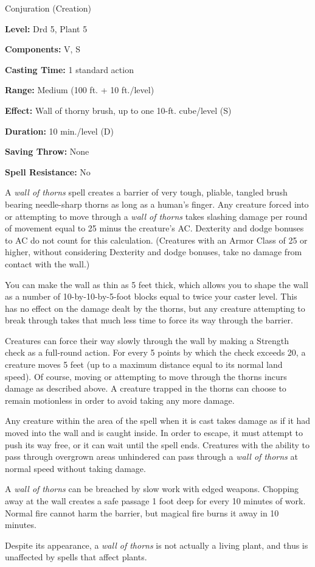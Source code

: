 
Conjuration (Creation)

\textbf{Level:} Drd 5, Plant 5

\textbf{Components:} V, S

\textbf{Casting Time:} 1 standard action

\textbf{Range:} Medium (100 ft. + 10 ft./level)

\textbf{Effect:} Wall of thorny brush, up to one 10-ft. cube/level (S)

\textbf{Duration:} 10 min./level (D)

\textbf{Saving Throw:} None

\textbf{Spell Resistance:} No

A \textit{wall of thorns} spell creates a barrier of very tough, pliable, tangled 
brush bearing needle-sharp thorns as long as a human's finger. Any creature forced 
into or attempting to move through a \textit{wall of thorns} takes slashing damage 
per round of movement equal to 25 minus the creature's AC. Dexterity and dodge 
bonuses to AC do not count for this calculation. (Creatures with an Armor Class 
of 25 or higher, without considering Dexterity and dodge bonuses, take no damage 
from contact with the wall.)

You can make the wall as thin as 5 feet thick, which allows you to shape the wall 
as a number of 10-by-10-by-5-foot blocks equal to twice your caster level. This 
has no effect on the damage dealt by the thorns, but any creature attempting to 
break through takes that much less time to force its way through the barrier.

Creatures can force their way slowly through the wall by making a Strength check 
as a full-round action. For every 5 points by which the check exceeds 20, a creature 
moves 5 feet (up to a maximum distance equal to its normal land speed). Of course, 
moving or attempting to move through the thorns incurs damage as described above. 
A creature trapped in the thorns can choose to remain motionless in order to avoid 
taking any more damage.

Any creature within the area of the spell when it is cast takes damage as if it 
had moved into the wall and is caught inside. In order to escape, it must attempt 
to push its way free, or it can wait until the spell ends. Creatures with the ability 
to pass through overgrown areas unhindered can pass through a \textit{wall of thorns 
}at normal speed without taking damage.

A \textit{wall of thorns} can be breached by slow work with edged weapons. Chopping 
away at the wall creates a safe passage 1 foot deep for every 10 minutes of work. 
Normal fire cannot harm the barrier, but magical fire burns it away in 10 minutes.

Despite its appearance, a \textit{wall of thorns} is not actually a living plant, 
and thus is unaffected by spells that affect plants.

